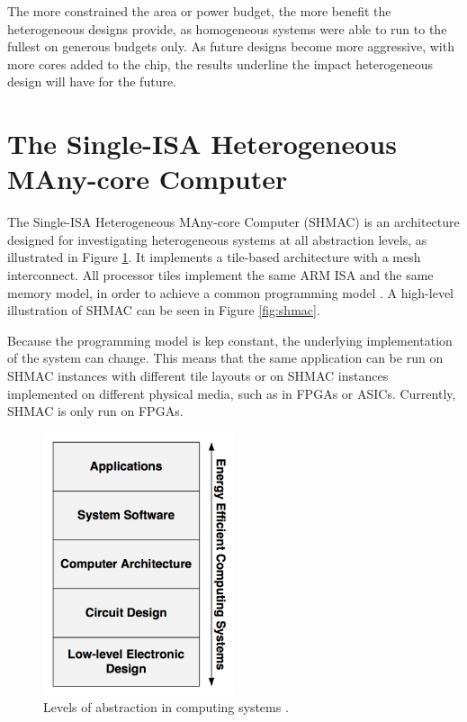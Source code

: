 The more constrained the area or power budget, the more benefit the heterogeneous designs provide, as homogeneous systems were able to run to the fullest on generous budgets only.
As future designs become more aggressive, with more cores added to the chip, the results underline the impact heterogeneous design will have for the future. 

\section{The Single-ISA Heterogeneous MAny-core Computer}
\label{sec:shmac}

The Single-ISA Heterogeneous MAny-core Computer (SHMAC) is an architecture designed for investigating heterogeneous
systems at all abstraction levels, as illustrated in Figure \ref{fig:shmacAbstractionLevels}.
It implements a tile-based architecture with a mesh interconnect. All processor tiles implement the same
ARM ISA and the same memory model, in order to achieve a common programming model \cite{shmac-plan}.
A high-level illustration of SHMAC can be seen in Figure \ref{fig:shmac}.

Because the programming model is kep constant, the underlying implementation of the system can change.
This means that the same application can be run on SHMAC instances with different tile layouts or on
SHMAC instances implemented on different physical media, such as in FPGAs or ASICs. Currently, SHMAC
is only run on FPGAs.

\begin{figure}[htb]
    \centering
    \includegraphics[width=0.5\textwidth]{Figures/Heterogeneous/SHMACAbstractionLevels}
    \caption{Levels of abstraction in computing systems \cite{shmac-plan}.}
    \label{fig:shmacAbstractionLevels}
\end{figure}

